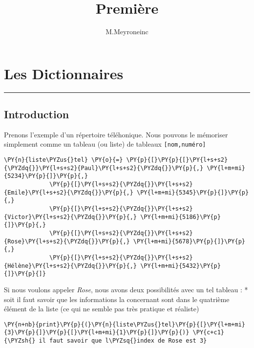\documentclass[12pt]{book}
\author{M.Meyroneinc}
\title{Première}
\begin{document}
   \dominitoc
  
\Tsix
\faketableofcontents
\setcounter{chapter}{22}

\chapter{Les Dictionnaires}
\minitoc     
 


\begin{center}\rule{0.5\linewidth}{0.5pt}\end{center}

    \hypertarget{introduction}{%
\section{Introduction}\label{introduction}}

Prenons l'exemple d'un répertoire téléhonique. Nous pouvons le mémoriser
simplement comme un tableau (ou liste) de tableaux
\texttt{{[}nom,numéro{]}}

    \begin{tcolorbox}[breakable, size=fbox, boxrule=1pt, pad at break*=1mm,colback=cellbackground, colframe=cellborder]
\begin{Verbatim}[commandchars=\\\{\}]
\PY{n}{liste\PYZus{}tel} \PY{o}{=} \PY{p}{[}\PY{p}{[}\PY{l+s+s2}{\PYZdq{}}\PY{l+s+s2}{Paul}\PY{l+s+s2}{\PYZdq{}}\PY{p}{,} \PY{l+m+mi}{5234}\PY{p}{]}\PY{p}{,}
             \PY{p}{[}\PY{l+s+s2}{\PYZdq{}}\PY{l+s+s2}{Emile}\PY{l+s+s2}{\PYZdq{}}\PY{p}{,} \PY{l+m+mi}{5345}\PY{p}{]}\PY{p}{,}
             \PY{p}{[}\PY{l+s+s2}{\PYZdq{}}\PY{l+s+s2}{Victor}\PY{l+s+s2}{\PYZdq{}}\PY{p}{,} \PY{l+m+mi}{5186}\PY{p}{]}\PY{p}{,}
             \PY{p}{[}\PY{l+s+s2}{\PYZdq{}}\PY{l+s+s2}{Rose}\PY{l+s+s2}{\PYZdq{}}\PY{p}{,} \PY{l+m+mi}{5678}\PY{p}{]}\PY{p}{,}
             \PY{p}{[}\PY{l+s+s2}{\PYZdq{}}\PY{l+s+s2}{Hélène}\PY{l+s+s2}{\PYZdq{}}\PY{p}{,} \PY{l+m+mi}{5432}\PY{p}{]}\PY{p}{]}
\end{Verbatim}
\end{tcolorbox}

    Si nous voulons appeler \emph{Rose}, nous avons deux possibilités avec
un tel tableau : * soit il faut savoir que les informations la
concernant sont dans le quatrième élément de la liste (ce qui ne semble
pas très pratique et réaliste)

    \begin{tcolorbox}[breakable, size=fbox, boxrule=1pt, pad at break*=1mm,colback=cellbackground, colframe=cellborder]
\begin{Verbatim}[commandchars=\\\{\}]
\PY{n+nb}{print}\PY{p}{(}\PY{n}{liste\PYZus{}tel}\PY{p}{[}\PY{l+m+mi}{3}\PY{p}{]}\PY{p}{[}\PY{l+m+mi}{1}\PY{p}{]}\PY{p}{)} \PY{c+c1}{\PYZsh{} il faut savoir que l\PYZsq{}index de Rose est 3}
\end{Verbatim}
\end{tcolorbox}
\end{document}
